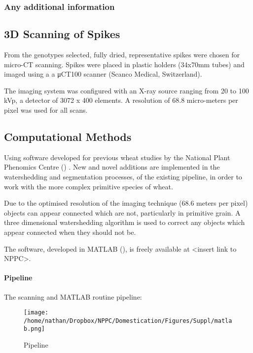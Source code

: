 \documentclass[a4paper, twocolumn]{article}
\begin{document}
\subsubsection{Any additional information}
\label{sec:org466452f}

\subsection{3D Scanning of Spikes}
\label{sec:org5959b54}

From the genotypes selected, fully dried,
representative spikes were chosen for micro-CT scanning.
Spikes were placed in plastic holders (34x70mm tubes) and imaged using a a μCT100 scanner (Scanco Medical, Switzerland).

The imaging system was configured with an X-ray source ranging from 20 to 100 kVp,
a detector of 3072 x 400 elements. A resolution of 68.8 micro-meters per pixel was used for all scans.


\subsection{Computational Methods}
\label{sec:org80fee3c}

Using software developed for previous wheat studies by the National Plant Phenomics Centre (\cite{Hughes2017}) . New and novel additions are implemented in the watershedding and segmentation processes, of the existing pipeline, in order to work with the more complex primitive species of wheat.

Due to the optimised resolution of the imaging technique (68.6\textmu{} meters per pixel) objects can appear connected which are not, particularly in primitive grain. A three dimensional watershedding algorithm is used to correct any objects which appear connected when they should not be.

The software, developed in MATLAB (\cite{MATHWORKS2017}), is freely available at <insert link to NPPC>.

\paragraph{Pipeline}
\label{sec:org1456d28}
The scanning and MATLAB routine pipeline:

\begin{figure}[htbp]
\centering
\texttt{[image: /home/nathan/Dropbox/NPPC/Domestication/Figures/Suppl/matlab.png]}
\caption{\label{fig:org913f1fd}
Pipeline}
\end{figure}
\end{document}
